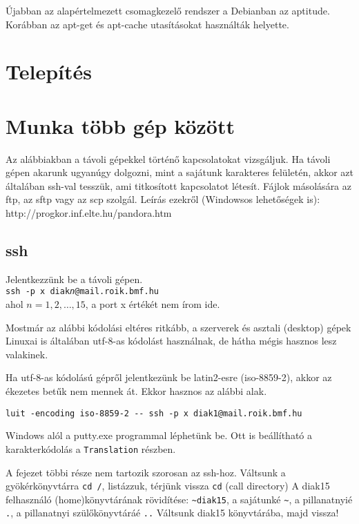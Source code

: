 \documentclass[a4paper]{article}
\newcommand{\code}{\texttt}
\begin{document}
Újabban az alapértelmezett csomagkezelő rendszer a Debianban az
aptitude. Korábban az apt-get és apt-cache utasításokat használták
helyette.

\section{Telepítés}


\newpage
\section{Munka több gép között}

Az alábbiakban a távoli gépekkel történő kapcsolatokat vizsgáljuk. Ha
távoli gépen akarunk ugyanúgy dolgozni, mint a sajátunk karakteres
felületén, akkor azt általában ssh-val tesszük, ami titkosított
kapcsolatot létesít. Fájlok másolására az ftp, az sftp vagy az scp
szolgál. Leírás ezekről (Windowsos lehetőségek is):\\
http://progkor.inf.elte.hu/pandora.htm

\subsection{ssh}
Jelentkezzünk be a távoli gépen.\\
\texttt{ssh -p x diak\textit{n}@mail.roik.bmf.hu}\\
ahol $n=1,2,\dots,15$, a port x értékét nem írom ide.

Mostmár az alábbi kódolási eltéres ritkább, a szerverek és asztali
(desktop) gépek Linuxai is általában utf-8-as kódolást használnak, de
hátha mégis hasznos lesz valakinek.

Ha utf-8-as kódolású gépről jelentkezünk be latin2-esre (iso-8859-2),
akkor az ékezetes betűk nem mennek át. Ekkor hasznos az alábbi alak.
\begin{Verbatim}
luit -encoding iso-8859-2 -- ssh -p x diak1@mail.roik.bmf.hu
\end{Verbatim}
Windows alól a putty.exe programmal léphetünk be. Ott is beállítható a
karakterkódolás a \texttt{Translation} részben.

A fejezet többi része nem tartozik szorosan az ssh-hoz.
Váltsunk a gyökérkönyvtárra \code{cd /}, listázzuk, térjünk vissza \code{cd} 
(call directory) A diak15 felhasználó (home)könyvtárának rövidítése:
\code{\~{}diak15}, a sajátunké \code{\~{}}, a pillanatnyié \code{.}, a
pillanatnyi szülőkönyvtáráé \code{..} Váltsunk diak15 könyvtárába, majd
vissza!
\end{document}
